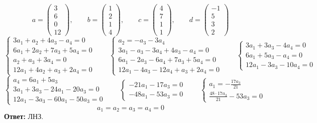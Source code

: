 $$ a=
\begin{pmatrix}
	3 \\
    6 \\
    0 \\
    12
\end{pmatrix}, \qquad b =
\begin{pmatrix}
	1 \\
    2 \\
    1 \\
    4
\end{pmatrix}, \qquad c =
\begin{pmatrix}
	4 \\
    7 \\
    1 \\
    1
\end{pmatrix}, \qquad d =
\begin{pmatrix}
	-1 \\
    5 \\
    3 \\
    2
\end{pmatrix} $$
$$
\begin{cases}
	3a_1 + a_2 + 4a_3 - a_4 = 0 \\
    6a_1 + 2a_2 + 7a_3 + 5a_4 = 0 \\
    a_2 + a_3 + 3a_4 = 0 \\
    12a_1 + 4a_2 + a_3 + 2a_4 = 0
\end{cases} \qquad
\begin{cases}
	a_2 = -a_3 - 3a_4 \\
    3a_1 - a_3 - 3a_4 + 4a_3 - a_4 = 0 \\
    6a_1 - 2a_3 - 6a_4 + 7a_3 + 5a_4 = 0 \\
    12a_1 - 4a_3 - 12a_4 + a_3 + 2a_4 = 0
\end{cases} \qquad
\begin{cases}
	3a_1 + 3a_3 - 4a_4 = 0 \\
    6a_1 + 5a_3 - a_4 = 0 \\
    12a_1 - 3a_3 - 10a_4 = 0
\end{cases} $$
$$
\begin{cases}
	a_4 = 6a_1 + 5a_3 \\
    3a_1 + 3a_3 - 24a_1 - 20a_3 = 0 \\
    12a_1 - 3a_3 - 60a_1 - 50a_3 = 0
\end{cases} \qquad
\begin{cases}
	-21a_1 - 17a_3 = 0 \\
    -48a_1 - 53a_3 = 0
\end{cases} \qquad
\begin{cases}
    a_1 = -\frac{17a_3}{21} \\
    \frac{48 \cdot 17a_3}{21} - 53a_3 = 0
\end{cases} $$
$$ a_1 = a_2 = a_3 = a_4 = 0 $$
\textbf{Ответ:} ЛНЗ.

